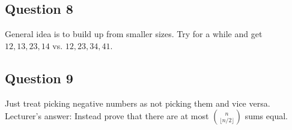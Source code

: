 \documentclass[a4paper]{article}
\begin{document}
\subsection{Question 8}
General idea is to build up from smaller sizes. Try for a while and get $12,13,23,14$ vs. $12,23,34,41$.

\subsection{Question 9}
Just treat picking negative numbers as not picking them and vice versa.\\
Lecturer's answer: Instead prove that there are at most ${n \choose {\lfloor n/2 \rfloor}}$ sums equal.
\end{document}
